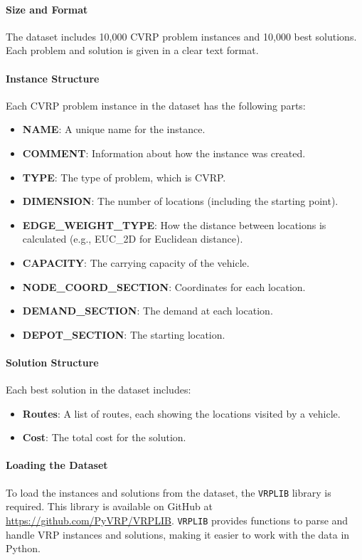 \documentclass{article}
\begin{document}
    \paragraph{Size and Format}
    The dataset includes 10,000 CVRP problem instances and 10,000 best solutions. Each problem and solution is given in a clear text format.

    \paragraph{Instance Structure}
    Each CVRP problem instance in the dataset has the following parts:
    \begin{itemize}
        \item \textbf{NAME}: A unique name for the instance.
        \item \textbf{COMMENT}: Information about how the instance was created.
        \item \textbf{TYPE}: The type of problem, which is CVRP.
        \item \textbf{DIMENSION}: The number of locations (including the starting point).
        \item \textbf{EDGE\_WEIGHT\_TYPE}: How the distance between locations is calculated (e.g., EUC\_2D for Euclidean distance).
        \item \textbf{CAPACITY}: The carrying capacity of the vehicle.
        \item \textbf{NODE\_COORD\_SECTION}: Coordinates for each location.
        \item \textbf{DEMAND\_SECTION}: The demand at each location.
        \item \textbf{DEPOT\_SECTION}: The starting location.
    \end{itemize}

    \paragraph{Solution Structure}
    Each best solution in the dataset includes:
    \begin{itemize}
        \item \textbf{Routes}: A list of routes, each showing the locations visited by a vehicle.
        \item \textbf{Cost}: The total cost for the solution.
    \end{itemize}

    \paragraph{Loading the Dataset}
    To load the instances and solutions from the dataset, the \texttt{VRPLIB} library is required.
    This library is available on GitHub at \url{https://github.com/PyVRP/VRPLIB}.
    \texttt{VRPLIB} provides functions to parse and handle VRP instances and solutions, making it easier to work with the data in Python.
\end{document}
